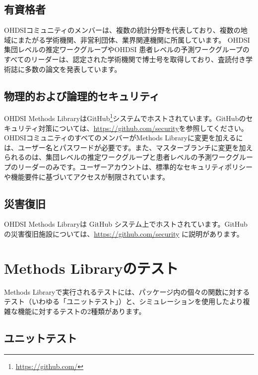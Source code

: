 \documentclass[
  11pt]{book}
\theoremstyle{definition}
\theoremstyle{definition}
\theoremstyle{definition}
\theoremstyle{definition}
\theoremstyle{remark}
\begin{document}
\subsection{有資格者}\label{ux6709ux8cc7ux683cux8005}

OHDSIコミュニティのメンバーは、複数の統計分野を代表しており、複数の地域にまたがる学術機関、非営利団体、業界関連機関に所属しています。 OHDSI集団レベルの推定ワークグループやOHDSI 患者レベルの予測ワークグループのすべてのリーダーは、認定された学術機関で博士号を取得しており、査読付き学術誌に多数の論文を発表しています。

\subsection{物理的および論理的セキュリティ}\label{ux7269ux7406ux7684ux304aux3088ux3073ux8ad6ux7406ux7684ux30bbux30adux30e5ux30eaux30c6ux30a3}

OHDSI Methods LibraryはGitHub\footnote{\url{https://github.com/}}システムでホストされています。GitHubのセキュリティ対策については、\url{https://github.com/security}を参照してください。OHDSIコミュニティのすべてのメンバーがMethods Libraryに変更を加えるには、ユーザー名とパスワードが必要です。また、マスターブランチに変更を加えられるのは、集団レベルの推定ワークグループと患者レベルの予測ワークグループのリーダーのみです。ユーザーアカウントは、標準的なセキュリティポリシーや機能要件に基づいてアクセスが制限されています。

\subsection{災害復旧}\label{ux707dux5bb3ux5fa9ux65e7}

OHDSI Methods Libraryは GitHub システム上でホストされています。GitHub の災害復旧施設については、\url{https://github.com/security} に説明があります。

\section{Methods Libraryのテスト}\label{methods-libraryux306eux30c6ux30b9ux30c8}

Methods Libraryで実行されるテストには、パッケージ内の個々の関数に対するテスト（いわゆる「ユニットテスト」）と、シミュレーションを使用したより複雑な機能に対するテストの2種類があります。

\subsection{ユニットテスト}\label{ux30e6ux30cbux30c3ux30c8ux30c6ux30b9ux30c8}
\end{document}
